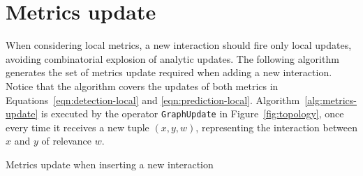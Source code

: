 \section{Metrics update}
\label{sec:metrics-update}

When considering local metrics, a new interaction should fire only local updates, avoiding combinatorial explosion of analytic updates.
The following algorithm generates the set of metrics update required when adding a new interaction.
Notice that the algorithm covers the updates of both metrics in Equations~\ref{eqn:detection-local} and \ref{eqn:prediction-local}. 
Algorithm~\ref{alg:metrics-update} is executed by the operator \texttt{GraphUpdate} in Figure~\ref{fig:topology}, once every time it receives a new tuple $(x,y,w)$, representing the interaction between $x$ and $y$ of relevance $w$.

\begin{algorithm}[h!]
  
  \vspace{1em}
  
   {
  	




  }
  
  \vspace{1em}
  
  \vspace{1em}
  \caption{Metrics update when inserting a new interaction}
  \label{alg:metrics-update}
\end{algorithm}

